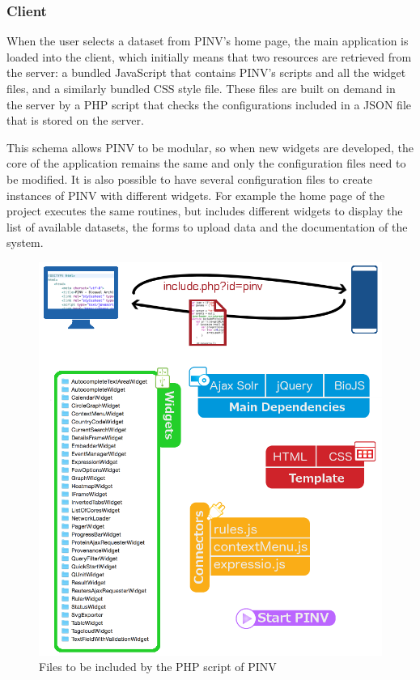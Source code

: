 \subsubsection{Client}
When the user selects a dataset from PINV's home page, the main application is loaded into the client, which initially means that two resources are retrieved from the server: a bundled JavaScript that contains PINV's scripts and all the widget files, and a similarly bundled CSS style file. These files are built on demand in the server by a PHP script that checks the configurations included in a JSON file that is stored on the server. 

This schema allows PINV to be modular, so when new widgets are developed, the core of the application remains the same and only the configuration files need to be modified. It is also possible to have several configuration files to create instances of PINV with different widgets. For example the home page of the project executes the same routines, but includes different widgets to display the list of available datasets, the forms to upload data and the documentation of the system.

\begin{figure}
\centering
\includegraphics[width=\textwidth]{figures/include_php.png}
\caption[Files to be included by the PHP script of PINV]{Files to be included by the PHP script of PINV
\label{fig:pinv_include}}
\end{figure}

